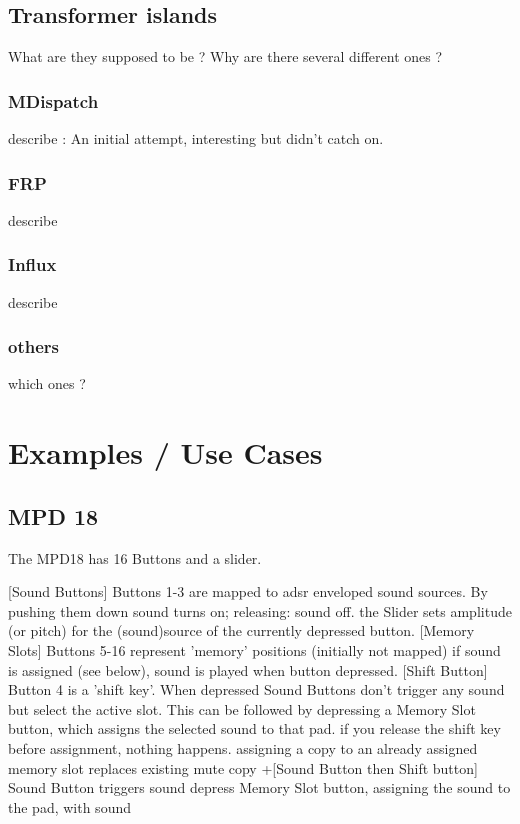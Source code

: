 \documentclass{article}
\begin{document}
\subsection{Transformer islands} 

What are they supposed to be ? Why are there several different ones ?	
	
\subsubsection{MDispatch}	

describe : An initial attempt, interesting but didn't catch on.
		
\subsubsection{FRP}

describe~\cite{-uni}



\subsubsection{Influx}

describe

\subsubsection{others}

which ones ?

\section{Examples / Use Cases}
\label{sec:examples_use_cases}


\subsection{MPD 18}
\label{sub:mpd_18}

The MPD18 has 16 Buttons and a slider.

    [Sound Buttons] Buttons 1-3 are mapped to adsr enveloped sound sources.
        By pushing them down sound turns on; releasing: sound off.
    the Slider sets amplitude (or pitch) for the (sound)source of the currently depressed button.
    [Memory Slots] Buttons 5-16 represent 'memory' positions (initially not mapped)
        if sound is assigned (see below), sound is played when button depressed.
    [Shift Button] Button 4 is a 'shift key'. When depressed
        Sound Buttons don't trigger any sound but select the active slot. This can be followed by
        depressing a Memory Slot button, which assigns the selected sound to that pad.
        if you release the shift key before assignment, nothing happens.
        assigning a copy to an already assigned memory slot replaces existing
        mute copy +[Sound Button then Shift button]
        Sound Button triggers sound
        depress Memory Slot button, assigning the sound to the pad, with sound
\end{document}

